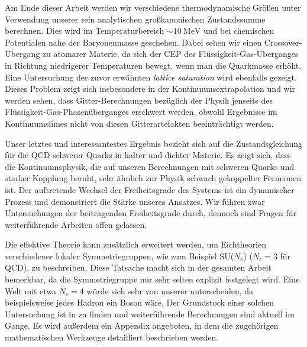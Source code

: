 Am Ende dieser Arbeit werden wir verschiedene thermodynamische Grö\-ßen unter
Verwendung unserer rein analytischen großkanonischen Zu\-stands\-summe
berechnen. Dies wird im Temperaturbereich $\sim 10 \:\mathrm{MeV}$ und bei
chemischen Potentialen nahe der Baryonenmasse geschehen. Dabei sehen wir einen
Crossover-Übergang zu atomarer Materie, da sich der CEP des
Flüssigkeit-Gas-Überganges in Richtung niedrigerer Temperaturen bewegt, wenn man
die Quarkmasse erhöht. Eine Untersuchung der zuvor erwähnten \emph{lattice
  saturation} wird ebenfalls gezeigt. Dieses Problem zeigt sich insbesondere in
der Kontinuumsextrapolation und wir werden sehen, dass Gitter-Berechnungen
bezüglich der Physik jenseits des Flüssigkeit-Gas-Pha\-sen\-über\-ganges
erschwert werden, obwohl Ergebnisse im Kontinuumslimes nicht von diesen
Gitterartefakten be\-ein\-träch\-tigt werden.

Unser letztes und interessantestes Ergebnis bezieht sich auf die
Zustandsgleichung für die QCD schwerer Quarks in kalter und dichter Materie. Es
zeigt sich, dass die Kontinuumsphysik, die auf unseren Berechnungen mit schweren
Quarks und starker Kopplung beruht, sehr ähnlich zur Physik schwach gekoppelter
Fermionen ist. Der auftretende Wechsel der Freiheitsgrade des Systems ist ein
dynamischer Prozess und demonstriert die Stärke unseres Ansatzes. Wir führen
zwar Untersuchungen der beitragenden Freiheitsgrade durch, dennoch sind Fragen
für weiterführende Arbeiten offen gelassen.

Die effektive Theorie kann zusätzlich erweitert werden, um Eichtheorien
verschiede\-ner lokaler Symmetriegruppen, wie zum Beispiel SU($N_c$) ($N_c = 3$
für QCD), zu beschrei\-ben. Diese Tatsache macht sich in der gesamten Arbeit
bemerkbar, da die Symmetriegruppe nur sehr selten explizit festgelegt wird. Eine
Welt mit etwa $N_c = 4$ würde sich sehr von unserer unterscheiden, da
beispielsweise jedes Hadron ein Boson wäre. Der Grundstock einer solchen
Untersuchung ist in  zu finden und weiterführende
Berechnungen sind aktuell im Gange. Es wird außerdem ein Appendix angeboten, in
dem die zugehörigen mathematischen Werkzeuge detailliert beschrieben werden.

\par \endgroup%
